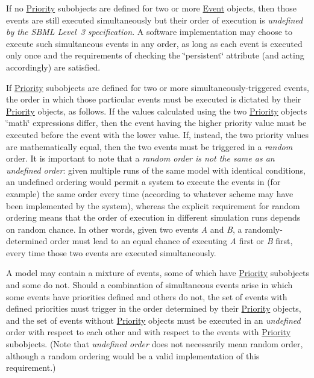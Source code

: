 If no \hyperlink{class_priority}{Priority} subobjects are defined for two or more \hyperlink{class_event}{Event} objects, then those events are still executed simultaneously but their order of execution is {\itshape undefined by the S\+B\+ML Level~3 specification}. A software implementation may choose to execute such simultaneous events in any order, as long as each event is executed only once and the requirements of checking the \char`\"{}persistent\char`\"{} attribute (and acting accordingly) are satisfied.

If \hyperlink{class_priority}{Priority} subobjects are defined for two or more simultaneously-\/triggered events, the order in which those particular events must be executed is dictated by their \hyperlink{class_priority}{Priority} objects, as follows. If the values calculated using the two \hyperlink{class_priority}{Priority} objects\textquotesingle{} \char`\"{}math\char`\"{} expressions differ, then the event having the higher priority value must be executed before the event with the lower value. If, instead, the two priority values are mathematically equal, then the two events must be triggered in a {\itshape random} order. It is important to note that a {\itshape random order is not the same as an undefined order}\+: given multiple runs of the same model with identical conditions, an undefined ordering would permit a system to execute the events in (for example) the same order every time (according to whatever scheme may have been implemented by the system), whereas the explicit requirement for random ordering means that the order of execution in different simulation runs depends on random chance. In other words, given two events {\itshape A} and {\itshape B}, a randomly-\/determined order must lead to an equal chance of executing {\itshape A} first or {\itshape B} first, every time those two events are executed simultaneously.

A model may contain a mixture of events, some of which have \hyperlink{class_priority}{Priority} subobjects and some do not. Should a combination of simultaneous events arise in which some events have priorities defined and others do not, the set of events with defined priorities must trigger in the order determined by their \hyperlink{class_priority}{Priority} objects, and the set of events without \hyperlink{class_priority}{Priority} objects must be executed in an {\itshape undefined} order with respect to each other and with respect to the events with \hyperlink{class_priority}{Priority} subobjects. (Note that {\itshape undefined order} does not necessarily mean random order, although a random ordering would be a valid implementation of this requirement.)

